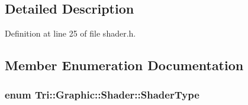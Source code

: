 \subsection{Detailed Description}


Definition at line 25 of file shader.\+h.



\subsection{Member Enumeration Documentation}
\hypertarget{class_tri_1_1_graphic_1_1_shader_aeab62c54cc59f0c320f7472448afb97f}{}
\subsubsection[{Shader\+Type}]{\setlength{\rightskip}{0pt plus 5cm}enum {\bf Tri\+::\+Graphic\+::\+Shader\+::\+Shader\+Type}}\label{class_tri_1_1_graphic_1_1_shader_aeab62c54cc59f0c320f7472448afb97f}
